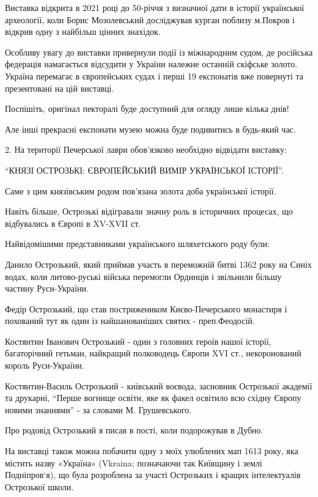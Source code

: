 Виставка відкрита в 2021 році до 50-річчя з визначної дати в історії
української археології, коли Борис Мозолевський досліджував курган поблизу
м.Покров і відкрив одну з найбільш цінних знахідок.


Особливу увагу до виставки привернули події із міжнародним судом, де російська
федерація намагається відсудити у України належне останній скіфське золото.
Україна перемагає в європейських судах і перші 19 експонатів вже повернуті та
презентовані на цій виставці.

Поспішіть, оригінал пекторалі буде доступний для огляду лише кілька днів! 


Але інші прекрасні експонати музею можна буде подивитись в будь-який час.

2. На території Печерської лаври обов’язково необхідно відвідати виставку:

\enquote{КНЯЗІ ОСТРОЗЬКІ: ЄВРОПЕЙСЬКИЙ ВИМІР УКРАЇНСЬКОЇ ІСТОРІЇ}.

Саме з цим князівським родом пов’язана золота доба української історії. 

Навіть більше, Острозькі відігравали значну роль в історичних процесах, що
відбувались в Європі в XV-XVII ст. 

Найвідомішими представниками українського шляхетського роду були:

Данило Острозький, який приймав участь в переможній битві 1362 року на Синіх
водах, коли литово-руські війська перемогли Ординців і звільнили більшу частину
Руси-України. 

Федір Острозький, що став пострижеником Києво-Печерського монастиря і похований
тут як один із найшанованіших святих - преп.Феодосій.

Костянтин Іванович Острозький - один з головних героїв нашої історії,
багаторічний гетьман, найкращий полководець Європи XVI ст., некоронований
король Руси-України.

Костянтин-Василь Острозький - київський воєвода, засновник Острозької академії
та друкарні, \enquote{Перше вогнище освіти, яке як факел освітило всю східну
Європу новими знаннями} - за словами М. Грушевського.  

Про родовід Острозький я писав в пості, коли подорожував в Дубно.

На виставці також можна побачити одну з моїх улюблених мап 1613 року, яка
містить назву «Україна» (Vkraina; позначаючи так Київщину і землі Подніпров‘я),
що була розроблена за участі Острозьких і кращих інтелектуалів Острозької
школи.

